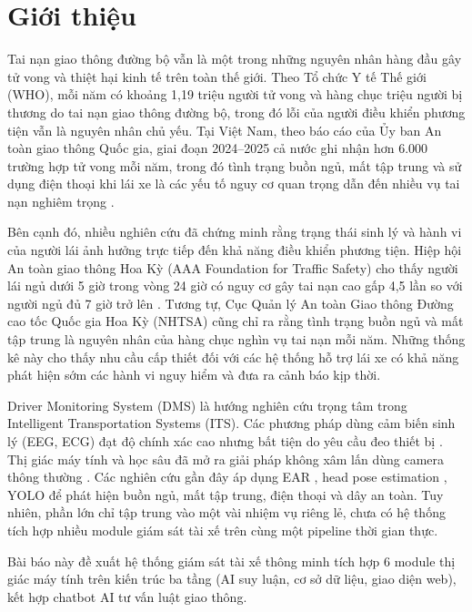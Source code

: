 \section{Giới thiệu}

Tai nạn giao thông đường bộ vẫn là một trong những nguyên nhân hàng đầu gây tử vong và thiệt hại kinh tế trên toàn thế giới. Theo Tổ chức Y tế Thế giới (WHO), mỗi năm có khoảng 1,19 triệu người tử vong và hàng chục triệu người bị thương do tai nạn giao thông đường bộ, trong đó lỗi của người điều khiển phương tiện vẫn là nguyên nhân chủ yếu. Tại Việt Nam, theo báo cáo của Ủy ban An toàn giao thông Quốc gia, giai đoạn 2024--2025 cả nước ghi nhận hơn 6.000 trường hợp tử vong mỗi năm, trong đó tình trạng buồn ngủ, mất tập trung và sử dụng điện thoại khi lái xe là các yếu tố nguy cơ quan trọng dẫn đến nhiều vụ tai nạn nghiêm trọng \cite{hien2026, baogiaothong2025}.

Bên cạnh đó, nhiều nghiên cứu đã chứng minh rằng trạng thái sinh lý và hành vi của người lái ảnh hưởng trực tiếp đến khả năng điều khiển phương tiện. Hiệp hội An toàn giao thông Hoa Kỳ (AAA Foundation for Traffic Safety) cho thấy người lái ngủ dưới 5 giờ trong vòng 24 giờ có nguy cơ gây tai nạn cao gấp 4,5 lần so với người ngủ đủ 7 giờ trở lên \cite{aaa2018}. Tương tự, Cục Quản lý An toàn Giao thông Đường cao tốc Quốc gia Hoa Kỳ (NHTSA) cũng chỉ ra rằng tình trạng buồn ngủ và mất tập trung là nguyên nhân của hàng chục nghìn vụ tai nạn mỗi năm. Những thống kê này cho thấy nhu cầu cấp thiết đối với các hệ thống hỗ trợ lái xe có khả năng phát hiện sớm các hành vi nguy hiểm và đưa ra cảnh báo kịp thời.

Driver Monitoring System (DMS) là hướng nghiên cứu trọng tâm trong Intelligent Transportation Systems (ITS). Các phương pháp dùng cảm biến sinh lý (EEG, ECG) đạt độ chính xác cao nhưng bất tiện do yêu cầu đeo thiết bị \cite{ji2002}. Thị giác máy tính và học sâu đã mở ra giải pháp không xâm lấn dùng camera thông thường \cite{voulodimos2018, lecun2015}. Các nghiên cứu gần đây áp dụng EAR \cite{soukupova2016}, head pose estimation \cite{lawson2020, malek2021}, YOLO \cite{redmon2016, jocher2023} để phát hiện buồn ngủ, mất tập trung, điện thoại và dây an toàn. Tuy nhiên, phần lớn chỉ tập trung vào một vài nhiệm vụ riêng lẻ, chưa có hệ thống tích hợp nhiều module giám sát tài xế trên cùng một pipeline thời gian thực.

Bài báo này đề xuất hệ thống giám sát tài xế thông minh tích hợp 6 module thị giác máy tính trên kiến trúc ba tầng (AI suy luận, cơ sở dữ liệu, giao diện web), kết hợp chatbot AI tư vấn luật giao thông.

